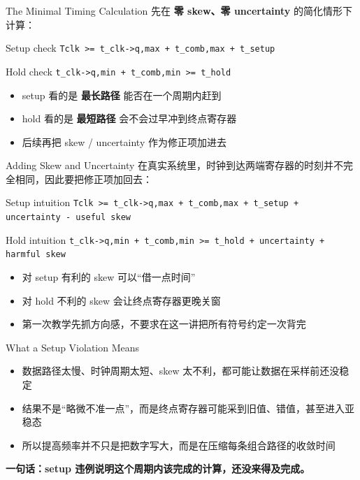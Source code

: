 \documentclass[aspectratio=169]{beamer}
\begin{document}
\begin{frame}{The Minimal Timing Calculation}
\small
先在 \textbf{零 skew、零 uncertainty} 的简化情形下计算：

\vspace{0.5em}
\begin{block}{Setup check}
\centering
\texttt{Tclk >= t\_clk->q,max + t\_comb,max + t\_setup}
\end{block}

\begin{block}{Hold check}
\centering
\texttt{t\_clk->q,min + t\_comb,min >= t\_hold}
\end{block}

\vspace{0.4em}
\begin{itemize}
  \item setup 看的是 \textbf{最长路径} 能否在一个周期内赶到
  \item hold 看的是 \textbf{最短路径} 会不会过早冲到终点寄存器
  \item 后续再把 skew / uncertainty 作为修正项加进去
\end{itemize}
\end{frame}

\begin{frame}{Adding Skew and Uncertainty}
\small
在真实系统里，时钟到达两端寄存器的时刻并不完全相同，因此要把修正项加回去：

\vspace{0.5em}
\begin{block}{Setup intuition}
\centering
\texttt{Tclk >= t\_clk->q,max + t\_comb,max + t\_setup + uncertainty - useful skew}
\end{block}

\begin{block}{Hold intuition}
\centering
\texttt{t\_clk->q,min + t\_comb,min >= t\_hold + uncertainty + harmful skew}
\end{block}

\vspace{0.4em}
\begin{itemize}
  \item 对 setup 有利的 skew 可以“借一点时间”
  \item 对 hold 不利的 skew 会让终点寄存器更晚关窗
  \item 第一次教学先抓方向感，不要求在这一讲把所有符号约定一次背完
\end{itemize}
\end{frame}

\begin{frame}{What a Setup Violation Means}
\small
\begin{itemize}
  \item 数据路径太慢、时钟周期太短、skew 太不利，都可能让数据在采样前还没稳定
  \item 结果不是“略微不准一点”，而是终点寄存器可能采到旧值、错值，甚至进入亚稳态
  \item 所以提高频率并不只是把数字写大，而是在压缩每条组合路径的收敛时间
\end{itemize}

\vspace{0.6em}
\textbf{一句话：setup 违例说明这个周期内该完成的计算，还没来得及完成。}
\end{frame}
\end{document}
